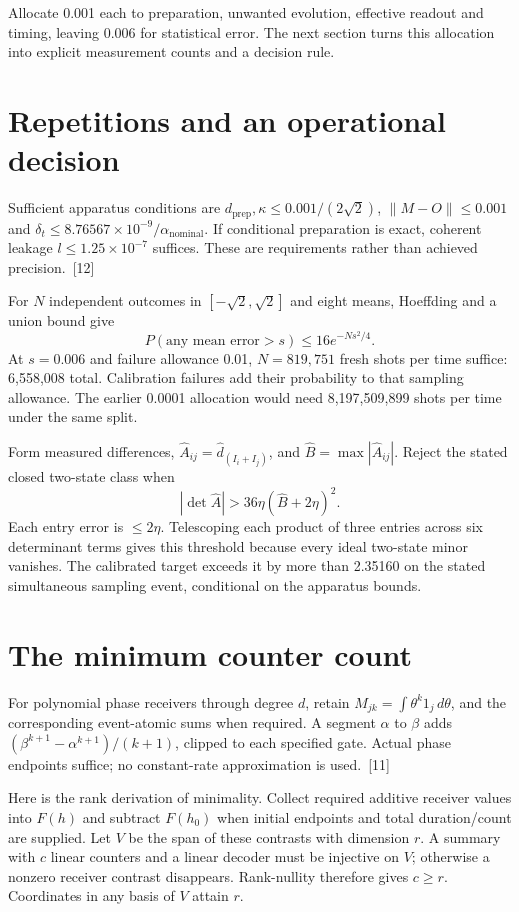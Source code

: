 \documentclass[10pt,twocolumn,letterpaper]{article}
\begin{document}
Allocate 0.001 each to preparation, unwanted evolution, effective readout and timing, leaving 0.006 for statistical error. The next section turns this allocation into explicit measurement counts and a decision rule.

\section{Repetitions and an operational decision}
Sufficient apparatus conditions are $d_{\mathrm{prep}},\kappa\leq0.001/(2\sqrt2)$, $\lVert M-O\rVert\leq0.001$ and $\delta_t\leq8.76567\times10^{-9}/\alpha_{\mathrm{nominal}}$. If conditional preparation is exact, coherent leakage $l\leq1.25\times10^{-7}$ suffices. These are requirements rather than achieved precision.~[12]

For $N$ independent outcomes in $[-\sqrt2,\sqrt2]$ and eight means, Hoeffding and a union bound give
\[
P(\text{any mean error}>s)\leq16e^{-Ns^2/4}.
\]
At $s=0.006$ and failure allowance 0.01, $N=819{,}751$ fresh shots per time suffice: 6,558,008 total. Calibration failures add their probability to that sampling allowance. The earlier 0.0001 allocation would need 8,197,509,899 shots per time under the same split.

Form measured differences, $\widehat A_{ij}=\widehat d_{(I_i+I_j)}$, and $\widehat B=\max|\widehat A_{ij}|$. Reject the stated closed two-state class when
\[
|\det\widehat A|>36\eta(\widehat B+2\eta)^2.
\]
Each entry error is $\leq2\eta$. Telescoping each product of three entries across six determinant terms gives this threshold because every ideal two-state minor vanishes. The calibrated target exceeds it by more than 2.35160 on the stated simultaneous sampling event, conditional on the apparatus bounds.

\section{The minimum counter count}
For polynomial phase receivers through degree $d$, retain $M_{jk}=\int\theta^k1_j\,d\theta$, and the corresponding event-atomic sums when required. A segment $\alpha$ to $\beta$ adds $(\beta^{k+1}-\alpha^{k+1})/(k+1)$, clipped to each specified gate. Actual phase endpoints suffice; no constant-rate approximation is used.~[11]

Here is the rank derivation of minimality. Collect required additive receiver values into $F(h)$ and subtract $F(h_0)$ when initial endpoints and total duration/count are supplied. Let $V$ be the span of these contrasts with dimension $r$. A summary with $c$ linear counters and a linear decoder must be injective on $V$; otherwise a nonzero receiver contrast disappears. Rank-nullity therefore gives $c\geq r$. Coordinates in any basis of $V$ attain $r$.
\end{document}
